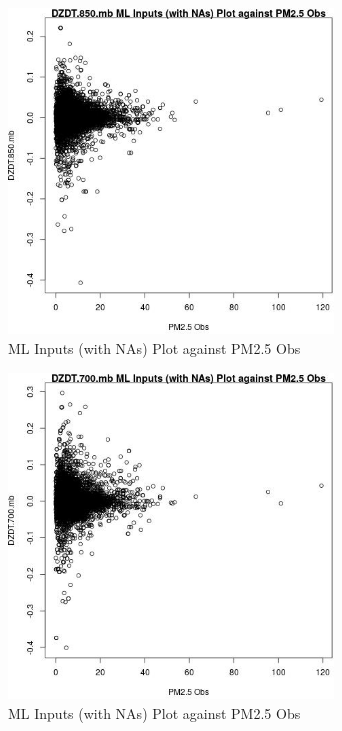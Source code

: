 \begin{figure} 
\centering  
\includegraphics[width=0.77\textwidth]{Code_Outputs/Report_ML_input_PM25_Step4_part_e_de_duplicated_aves_compiled_2019-05-18wNAs_DZDT850mbvPM25_Obs.jpg} 
\caption{\label{fig:Report_ML_input_PM25_Step4_part_e_de_duplicated_aves_compiled_2019-05-18wNAsDZDT850mbvPM25_Obs}ML Inputs (with NAs) Plot against PM2.5 Obs} 
\end{figure} 
 

\begin{figure} 
\centering  
\includegraphics[width=0.77\textwidth]{Code_Outputs/Report_ML_input_PM25_Step4_part_e_de_duplicated_aves_compiled_2019-05-18wNAs_DZDT700mbvPM25_Obs.jpg} 
\caption{\label{fig:Report_ML_input_PM25_Step4_part_e_de_duplicated_aves_compiled_2019-05-18wNAsDZDT700mbvPM25_Obs}ML Inputs (with NAs) Plot against PM2.5 Obs} 
\end{figure} 
 

